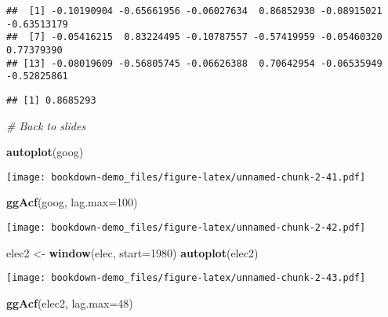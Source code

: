 \documentclass[]{book}
\newenvironment{Shaded}{\begin{snugshade}}{\end{snugshade}}
\newcommand{\CommentTok}[1]{\textcolor[rgb]{0.56,0.35,0.01}{\textit{#1}}}
\newcommand{\DataTypeTok}[1]{\textcolor[rgb]{0.13,0.29,0.53}{#1}}
\newcommand{\DecValTok}[1]{\textcolor[rgb]{0.00,0.00,0.81}{#1}}
\newcommand{\KeywordTok}[1]{\textcolor[rgb]{0.13,0.29,0.53}{\textbf{#1}}}
\newcommand{\NormalTok}[1]{#1}
\newcommand{\OperatorTok}[1]{\textcolor[rgb]{0.81,0.36,0.00}{\textbf{#1}}}
\newcommand{\StringTok}[1]{\textcolor[rgb]{0.31,0.60,0.02}{#1}}
\begin{document}
\begin{verbatim}
##  [1] -0.10190904 -0.65661956 -0.06027634  0.86852930 -0.08915021 -0.63513179
##  [7] -0.05416215  0.83224495 -0.10787557 -0.57419959 -0.05460320  0.77379390
## [13] -0.08019609 -0.56805745 -0.06626388  0.70642954 -0.06535949 -0.52825861
\end{verbatim}

\begin{Shaded}
\end{Shaded}

\begin{verbatim}
## [1] 0.8685293
\end{verbatim}

\begin{Shaded}
\begin{Highlighting}[]
\CommentTok{# Back to slides}

  \KeywordTok{autoplot}\NormalTok{(goog)}
\end{Highlighting}
\end{Shaded}

\texttt{[image: bookdown-demo\_files/figure-latex/unnamed-chunk-2-41.pdf]}

\begin{Shaded}
\begin{Highlighting}[]
  \KeywordTok{ggAcf}\NormalTok{(goog, }\DataTypeTok{lag.max=}\DecValTok{100}\NormalTok{)}
\end{Highlighting}
\end{Shaded}

\texttt{[image: bookdown-demo\_files/figure-latex/unnamed-chunk-2-42.pdf]}

\begin{Shaded}
\begin{Highlighting}[]
\NormalTok{  elec2 <-}\StringTok{ }\KeywordTok{window}\NormalTok{(elec, }\DataTypeTok{start=}\DecValTok{1980}\NormalTok{)}
  \KeywordTok{autoplot}\NormalTok{(elec2)}
\end{Highlighting}
\end{Shaded}

\texttt{[image: bookdown-demo\_files/figure-latex/unnamed-chunk-2-43.pdf]}

\begin{Shaded}
\begin{Highlighting}[]
  \KeywordTok{ggAcf}\NormalTok{(elec2, }\DataTypeTok{lag.max=}\DecValTok{48}\NormalTok{)}
\end{Highlighting}
\end{Shaded}
\end{document}

